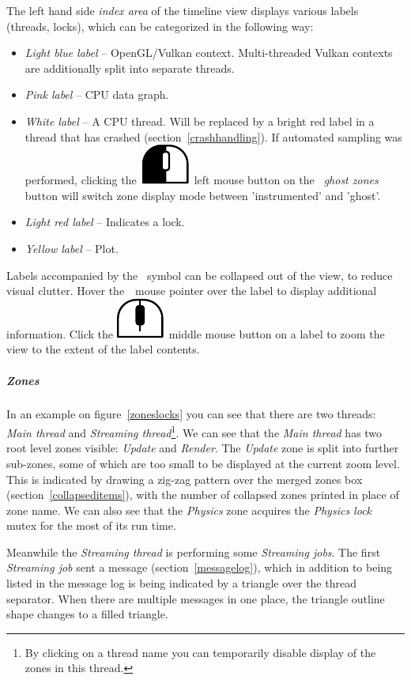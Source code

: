 \documentclass[hidelinks,titlepage,a4paper]{article}
\newcommand{\LMB}{\includegraphics[height=.8\baselineskip]{icons/lmb}}
\newcommand{\MMB}{\includegraphics[height=.8\baselineskip]{icons/mmb}}
\begin{document}
The left hand side \emph{index area} of the timeline view displays various labels (threads, locks), which can be categorized in the following way:

\begin{itemize}
\item \emph{Light blue label} -- OpenGL/Vulkan context. Multi-threaded Vulkan contexts are additionally split into separate threads.
\item \emph{Pink label} -- CPU data graph.
\item \emph{White label} -- A CPU thread. Will be replaced by a bright red label in a thread that has crashed (section~\ref{crashhandling}). If automated sampling was performed, clicking the~\LMB{}~left mouse button on the \emph{\faGhost{}~ghost zones} button will switch zone display mode between 'instrumented' and 'ghost'.
\item \emph{Light red label} -- Indicates a lock.
\item \emph{Yellow label} -- Plot.
\end{itemize}

Labels accompanied by the \faCaretDown{}~symbol can be collapsed out of the view, to reduce visual clutter. Hover the~\faMousePointer{}~mouse pointer over the label to display additional information. Click the \MMB{}~middle mouse button on a label to zoom the view to the extent of the label contents.

\subparagraph{Zones}

In an example on figure~\ref{zoneslocks} you can see that there are two threads: \emph{Main thread} and \emph{Streaming thread}\footnote{By clicking on a thread name you can temporarily disable display of the zones in this thread.}. We can see that the \emph{Main thread} has two root level zones visible: \emph{Update} and \emph{Render}. The \emph{Update} zone is split into further sub-zones, some of which are too small to be displayed at the current zoom level. This is indicated by drawing a zig-zag pattern over the merged zones box (section~\ref{collapseditems}), with the number of collapsed zones printed in place of zone name. We can also see that the \emph{Physics} zone acquires the \emph{Physics lock} mutex for the most of its run time.

Meanwhile the \emph{Streaming thread} is performing some \emph{Streaming jobs}. The first \emph{Streaming job} sent a message (section~\ref{messagelog}), which in addition to being listed in the message log is being indicated by a triangle over the thread separator. When there are multiple messages in one place, the triangle outline shape changes to a filled triangle.
\end{document}
